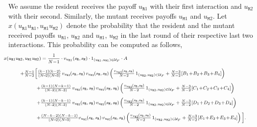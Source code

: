 \documentclass[11pt]{article}
\def\resident{\texttt{R}}
\def\mutant{\texttt{M}}
\def\strategy{s}
\theoremstyle{plainCl1}
\theoremstyle{plainCl2}
\begin{document}

We assume the resident receives the payoff \(u_{\resident1}\) with their first interaction and \(u_{\resident 2}\) with their second.
Similarly, the mutant receives payoffs \(u_{\mutant 1}\) and \(u_{\mutant 2}\). 
Let \(x(u_{\resident1} u_{\resident1}, u_{\mutant 1} u_{\mutant 2})\) denote the probability that the resident and the mutant received payoffs  \(u_{\resident1}\), \(u_{\resident2}\) and \(u_{\mutant 1}\), \(u_{\mutant 2}\) in the last round of their respective last two interactions.
This probability can be computed as follows, 
\begin{equation} \label{Eq:xTwoInteractions} 
  \setlength{\arraycolsep}{0.5cm}
  \footnotesize
  \hspace*{-0.8cm} 
  \begin{array}{lll}
  \multicolumn{3}{l}{x(u_{\resident1}u_{\resident 2}, u_{\mutant 1}u_{\mutant 2})= \displaystyle \frac{1}{N\!-\!1}\cdot v_{u_{\resident1}}(\strategy_\resident,\strategy_\mutant)\cdot 1_{(u_{\resident1},u_{\mutant 1})\in \mathcal{U}_F} \cdot A }\\[0.4cm]
  
  &\multicolumn{2}{l}{+ \frac{N-1}{N-2} \biggl[
  \frac{(k - 1)(k - 2)}{(N\!-\!2)(N\!-\!3)}\,
  v_{u_{\resident1}}\!(\strategy_\resident,\strategy_\mutant) \, v_{u_{\mutant 1}}\!(\strategy_\mutant,\strategy_\mutant) 
  \left( \frac{v_{u_{\resident 2}}\!(\strategy_\resident,\strategy_\mutant)}{N-2} \, 1_{(u_{\resident 2},u_{\mutant 2})\in \mathcal{U}_F} +\frac{N-3}{N-2} [B_1 \!+\! B_2 \!+\! B_3 \!+\! B_4]\right)}\\[0.4cm] 

  &&+ \frac{\left(k - 1\right) \left(N - k - 1\right)}{(N\!-\!2)(N\!-\!3)}\,
  v_{u_{\resident1}}\!(\strategy_\resident,\strategy_\mutant) \, v_{u_{\mutant 1}}\!(\strategy_\mutant,\strategy_\resident)  
  \left(\frac{v_{u_{\resident 2}}\!(\strategy_\resident,\strategy_\mutant)}{N-2} \, 1_{(u_{\resident 2},u_{\mutant 2})\in \mathcal{U}_F} + \frac{N-3}{N-2} [C_1 \!+\! C_2 \!+\! C_3 \!+\! C_4]\right) \\[0.4cm] 
  
  &&+ \frac{\left(k - 1\right) \left(N - k - 1\right)}{(N\!-\!2)(N\!-\!3)} \,
  v_{u_{\resident1}}\!(\strategy_\resident,\strategy_\resident) \, v_{u_{\mutant 1}}\!(\strategy_\mutant,\strategy_\mutant)  
  \left(\frac{v_{u_{\resident 2}}\!(\strategy_\resident,\strategy_\mutant)}{N-2} \, 1_{(u_{\resident 2},u_{\mutant 2})\in \mathcal{U}_F} + \frac{N-3}{N-2} [D_1 \!+\! D_2 \!+\! D_3 \!+\! D_4]\right) \\[0.4cm] 
  
  &&+ \frac{\left(N - k - 2\right) \left(N - k - 1\right)}{(N\!-\!2)(N\!-\!3)} 
  v_{u_{\resident1}}\!(\strategy_\resident,\strategy_\resident) \, v_{u_{\mutant 1}}\!(\strategy_\mutant,\strategy_\resident)  
  \left(\frac{ v_{u_{\resident 2}}\!(\strategy_\resident,\strategy_\mutant)}{N-2} \,1_{(u_{\resident 2},u_{\mutant 2})\in \mathcal{U}_F} + \frac{N-3}{N - 2} [E_1 \!+\! E_2 \!+\! E_3 \!+\! E_4]\right) \biggl] .
  \end{array}
\end{equation}
\end{document}
